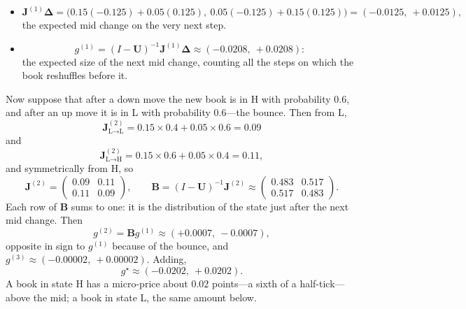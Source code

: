 \begin{example}
\begin{itemize}[leftmargin=1.5em,itemsep=2pt]
\item 
\[
  \mathbf{J}^{(1)}\boldsymbol{\Delta} = \big(0.15(-0.125) + 0.05(0.125),\ 0.05(-0.125) + 0.15(0.125)\big)
  = (-0.0125,\ +0.0125),
\]
the expected mid change on the very next step.
\item 
\[
  g^{(1)} = (I - \mathbf{U})^{-1}\mathbf{J}^{(1)}\boldsymbol{\Delta} \approx (-0.0208,\ +0.0208):
\]
the
  expected size of the next mid change, counting all the steps on which the book reshuffles before it.
\end{itemize}
Now suppose that after a down move the new book is in H with probability $0.6$, and after an up move it
is in L with probability $0.6$---the bounce. Then from L, 
\[
  \mathbf{J}^{(2)}_{\text{L}\to\text{L}} =
0.15 \times 0.4 + 0.05 \times 0.6 = 0.09
\]
and 
\[
  \mathbf{J}^{(2)}_{\text{L}\to\text{H}} = 0.15 \times 0.6
+ 0.05 \times 0.4 = 0.11,
\]
and symmetrically from H, so
\[
  \mathbf{J}^{(2)} = \begin{pmatrix} 0.09 & 0.11 \\ 0.11 & 0.09 \end{pmatrix}, \qquad
  \mathbf{B} = (I - \mathbf{U})^{-1}\mathbf{J}^{(2)} \approx \begin{pmatrix} 0.483 & 0.517 \\ 0.517 & 0.483 \end{pmatrix}.
\]
Each row of $\mathbf{B}$ sums to one: it is the distribution of the state just after the next mid change.
Then 
\[
  g^{(2)} = \mathbf{B}g^{(1)} \approx (+0.0007,\ -0.0007),
\]
opposite in sign to $g^{(1)}$ because
of the bounce, and $g^{(3)} \approx (-0.00002,\ +0.00002)$. Adding,
\[
  g^{\star} \approx (-0.0202,\ +0.0202).
\]
A book in state H has a micro-price about $0.02$ points---a sixth of a half-tick---above the mid; a
book in state L, the same amount below.
\end{example}

